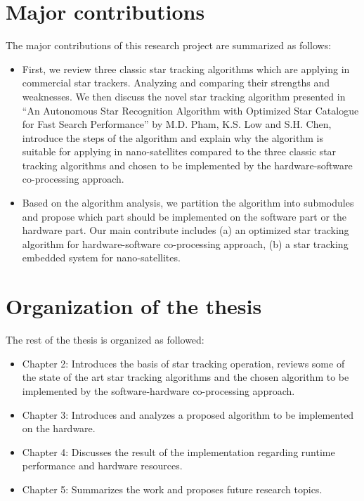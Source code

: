 \section{Major contributions}
The major contributions of this research project are summarized as follows:
\begin{itemize}
	\item First, we review three classic star tracking algorithms which are applying in commercial star trackers. Analyzing and comparing their strengths and weaknesses. We then discuss the novel star tracking algorithm presented in ``An Autonomous Star Recognition Algorithm with Optimized Star Catalogue for Fast Search Performance'' by M.D. Pham, K.S. Low and S.H. Chen\cite{edselc.2-52.0-8487677997120120101,edseee.655799920130101}, introduce the steps of the algorithm and explain why the algorithm is suitable for applying in nano-satellites compared to the three classic star tracking algorithms and chosen to be implemented by the hardware-software co-processing approach.
	\item Based on the algorithm analysis, we partition the algorithm into submodules and propose which part should be implemented on the software part or the hardware part. Our main contribute includes (a) an optimized star tracking algorithm for hardware-software co-processing approach, (b) a star tracking embedded system for nano-satellites. 
\end{itemize}

\section{Organization of the thesis}
The rest of the thesis is organized as followed:
\begin{itemize}
	\item Chapter 2: Introduces the basis of star tracking operation, reviews some of the state of the art star tracking algorithms and the chosen algorithm to be implemented by the software-hardware co-processing approach.
	\item Chapter 3: Introduces and analyzes a proposed algorithm to be implemented on the hardware.
	\item Chapter 4: Discusses the result of the implementation regarding runtime performance and hardware resources.
	\item Chapter 5: Summarizes the work and proposes future research topics.
\end{itemize}
